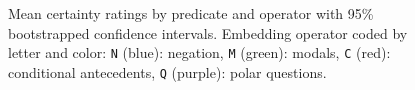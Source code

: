 \documentclass[12pt, a4paper]{article}
\begin{document}
\newpage

\begin{figure}[h]
	\centering
	\vspace{-1.7\baselineskip}
	\caption{\small Mean certainty ratings by predicate and operator with 95\% bootstrapped confidence intervals. Embedding operator coded by letter and color:  \texttt{N} (blue): negation, \texttt{M} (green): modals, \texttt{C} (red): conditional antecedents, \texttt{Q} (purple): polar questions.}
	\label{fig:figure1}
\end{figure}
\end{document}
